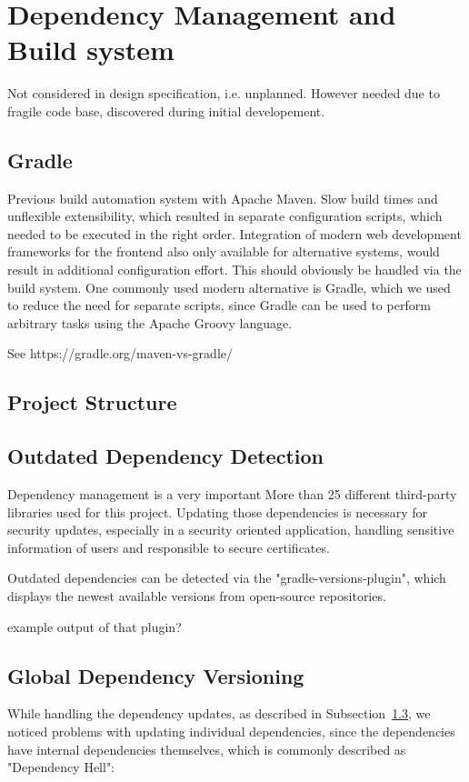 \section{Dependency Management and Build system}\label{sec:dependencyManagementBuildSystem}
Not considered in design specification, i.e. unplanned.
However needed due to fragile code base, discovered during initial developement.

\subsection{Gradle}\label{subsec:gradle}

Previous build automation system with Apache Maven.
Slow build times and unflexible extensibility, which resulted in separate configuration scripts, which needed to be
executed in the right order.
Integration of modern web development frameworks for the frontend also only available for alternative systems, would
result in additional configuration effort.
This should obviously be handled via the build system.
One commonly used modern alternative is Gradle, which we used to reduce the need for separate scripts, since Gradle can
be used to perform arbitrary tasks using the Apache Groovy language.

See https://gradle.org/maven-vs-gradle/
\subsection{Project Structure}\label{subsec:projectStructure}
\subsection{Outdated Dependency Detection}\label{subsec:outdatedDependencyDetection}
Dependency management is a very important
More than 25 different third-party libraries used for this project.
Updating those dependencies is necessary for security updates, especially in a security oriented application, handling
sensitive information of users and responsible to secure certificates.

Outdated dependencies can be detected via the "gradle-versions-plugin", which displays the newest available versions
from open-source repositories.

example output of that plugin?

\subsection{Global Dependency Versioning}\label{subsec:globalDependencyVersioning}
While handling the dependency updates, as described in Subsection~\ref{subsec:outdatedDependencyDetection}, we noticed
problems with updating individual dependencies, since the dependencies have internal dependencies themselves, which is
commonly described as "Dependency Hell": %

